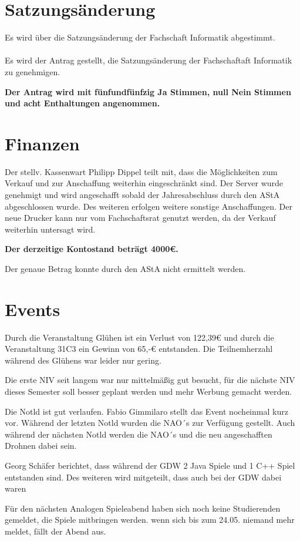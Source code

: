 \documentclass[a4paper, 11pt]{article} %
\begin{document}
\section{Satzungsänderung}
Es wird über die Satzungsänderung der Fachschaft Informatik abgestimmt.
\\\\
Es wird der Antrag gestellt, die Satzungsänderung der Fachschaftaft Informatik zu genehmigen.

\begin{center}
	\textbf{Der Antrag wird mit fünfundfünfzig Ja Stimmen, null Nein Stimmen und acht Enthaltungen angenommen.}
\end{center}
\section{Finanzen}
Der stellv. Kassenwart Philipp Dippel teilt mit, dass die Möglichkeiten zum Verkauf und zur Anschaffung weiterhin eingeschränkt sind. Der Server wurde genehmigt und wird angeschafft sobald der Jahresabschluss durch den AStA abgeschlossen wurde. Des weiteren erfolgen weitere sonstige Anschaffungen. 
Der neue Drucker kann nur vom Fachschaftsrat genutzt werden, da der Verkauf weiterhin untersagt wird.
\begin{center}
	\textbf{Der derzeitige Kontostand beträgt 4000€.}
\end{center}
Der genaue Betrag konnte durch den AStA nicht ermittelt werden.
\section{Events}
\begin{flushleft}
	Durch die Veranstaltung Glühen ist ein Verlust von 122,39€ und durch die Veranstaltung 31C3 ein Gewinn von 65,-€ entstanden. Die Teilnemherzahl während des Glühens war leider nur gering.
	
	Die erste NIV seit langem war nur mittelmäßig gut besucht, für die nächste NIV dieses Semester soll besser geplant werden und mehr Werbung gemacht werden.
	
	Die Notld ist gut verlaufen. Fabio Gimmilaro stellt das Event nocheinmal kurz vor. Während der letzten Notld wurden die NAO´s zur Verfügung gestellt. Auch während der nächsten Notld werden die NAO´s und die neu angeschafften Drohnen dabei sein.  
	
	Georg Schäfer berichtet, dass während der GDW 2 Java Spiele und 1 C++ Spiel entstanden sind. Des weiteren wird mitgeteilt, dass auch  bei der GDW dabei waren  
	
	Für den nächsten Analogen Spieleabend haben sich noch keine Studierenden gemeldet, die Spiele mitbringen werden. wenn sich bis zum 24.05. niemand mehr meldet, fällt der Abend aus.
\end{flushleft}
\end{document}
